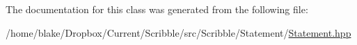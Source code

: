 The documentation for this class was generated from the following file\-:\begin{DoxyCompactItemize}
\item 
/home/blake/\-Dropbox/\-Current/\-Scribble/src/\-Scribble/\-Statement/\hyperlink{_statement_8hpp}{Statement.\-hpp}\end{DoxyCompactItemize}
